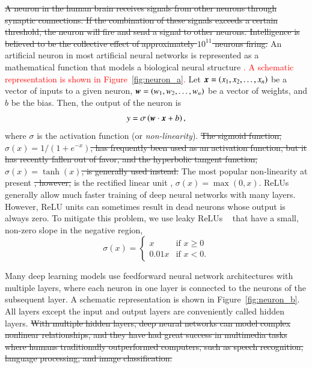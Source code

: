 \documentclass[fleqn,usenatbib]{mnras}
\newcommand{\changed}[1]{\textcolor{red}{#1}}
\begin{document}
\sout{ A neuron in the human brain receives signals from other neurons through synaptic connections.  If the combination of these signals exceeds a certain threshold, the neuron will fire and send a signal to other neurons.  Intelligence is believed to be the collective effect of approximately $10^{11}$ neurons firing.  }
An artificial neuron in most artificial neural networks is represented
as a mathematical function that models a biological neural structure
\changed{
\citep{aggarwal2014data}.
A schematic representation is shown in Figure~\ref{fig:neuron_a}.
}
Let $\bmath{x}=\left(x_1,x_2,\dots,x_n\right)$ be a vector of inputs to a given neuron,
$\bmath{w}=\left(w_1,w_2,\dots,w_n\right)$ be a vector of weights, and
$b$ be the bias.
Then, the output of the neuron is
\changed{
\citep{rosenblatt1961principles}
}
\begin{equation}
  y = \sigma \left( \bmath{w} \cdot \bmath{x} + b \right),
  \label{eq:neuron_output}
\end{equation}
where $\sigma$ is the activation function (or \textit{non-linearity}).
\sout{ The sigmoid function, $\sigma(x)=1/\left(1+e^{-x}\right)$, has frequently been used as an activation function, but it has recently fallen out of favor, and the hyperbolic tangent function, $\sigma(x)=\tanh(x)$, is generally used instead.  }
The most popular non-linearity at present
\sout{, however, }
is the rectified linear unit
\citep[ReLU;][]{nair2010rectified}, $\sigma(x)=\max(0, x)$.
ReLUs generally allow much faster
training of deep neural networks with many layers.
However, ReLU units can sometimes result in dead neurons whose output is always zero.
To mitigate this problem, we use leaky ReLUs
\changed{
~\citep{maas2013rectifier}
}
that have a small, non-zero slope in the negative region,
\begin{equation}
  \sigma(x) =
    \begin{cases}
      x & \mbox{if } x \geq 0 \\
      0.01x & \mbox{if } x < 0.
    \end{cases}
\end{equation}

Many deep learning models use feedforward neural network architectures with multiple layers,
where each neuron in one layer is connected to the neurons of the subsequent layer.
A schematic representation is shown in Figure~\ref{fig:neuron_b}.
All layers except the input and output layers are conveniently called hidden layers.
\sout{ With multiple hidden layers, deep neural networks can model complex nonlinear relationships, and they have had great success in multimedia tasks where humans traditionally outperformed computers, such as speech recognition, language processing, and image classification.  }
\end{document}
